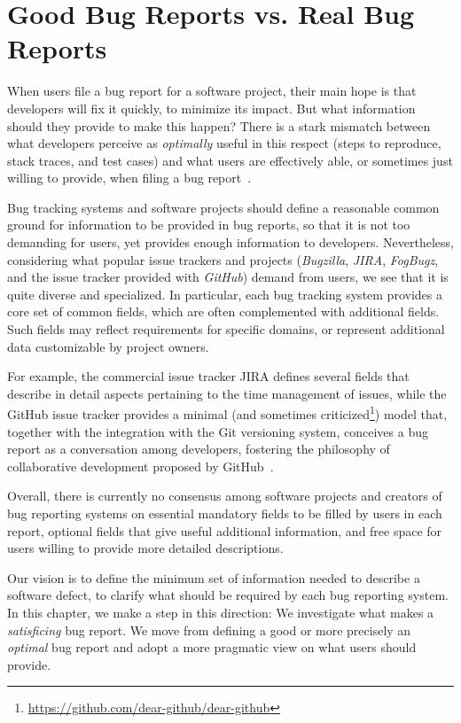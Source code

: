 \newpage


\section{Good Bug Reports vs. Real Bug Reports}\label{sec:model-intro}

When users file a bug report for a software project, their main hope is that developers will fix it quickly, to minimize its impact.
But what information should they provide to make this happen? There is a stark mismatch between what developers perceive as \emph{optimally} useful in this respect (\ie steps to reproduce, stack traces, and test cases) and what users are effectively able, or sometimes just willing to provide, when filing a bug report~\cite{Zimm2010a}.

Bug tracking systems and software projects should define a reasonable common ground for information to be provided in bug reports, so that it is not too demanding for users, yet provides enough information to developers.
Nevertheless, considering what popular issue trackers and projects (\eg \emph{Bugzilla}, \emph{JIRA}, \emph{FogBugz}, and the issue tracker provided with \emph{GitHub}) demand from users, we see that it is quite diverse and specialized.
In particular, each bug tracking system provides a core set of common fields, which are often complemented with additional fields.
Such  fields may reflect requirements for specific domains, or represent additional data customizable by project owners.

For example, the commercial issue tracker JIRA defines several fields that describe in detail aspects pertaining to the time management of issues, while the GitHub issue tracker provides a minimal (and sometimes criticized\footnote{\url{https://github.com/dear-github/dear-github}}) model that, together with the integration with the Git versioning system, conceives a bug report as a conversation among developers, fostering the philosophy of collaborative development proposed by GitHub~\cite{Thun2013}.

Overall, there is currently no consensus among software projects and creators of bug reporting systems on essential mandatory fields to be filled by users in each report, optional fields that give useful additional information, and free space for users willing to provide more detailed descriptions.

Our vision is to define the minimum set of information needed to describe a software defect, to clarify what should be required by each bug reporting system.
In this chapter, we make a step in this direction: We investigate what makes a \emph{satisficing} bug report.
We move from defining a good or more precisely an \emph{optimal} bug report and adopt a more pragmatic view on what users should provide.

